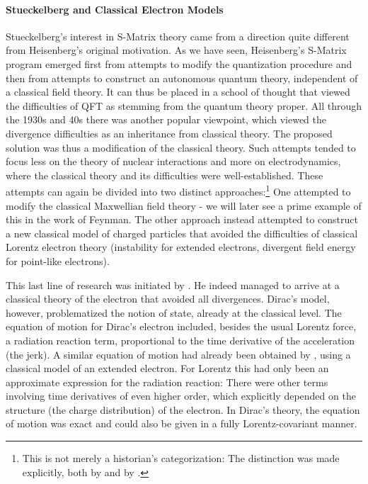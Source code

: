 \documentclass[12pt,a4paper]{article}
\begin{document}
\paragraph{Stueckelberg and Classical Electron Models}

Stueckelberg's interest in S-Matrix theory came from a direction quite different from Heisenberg's original motivation. As we have seen, Heisenberg's S-Matrix program emerged first from attempts to modify the quantization procedure and then from attempts to construct an autonomous quantum theory, independent of a classical field theory. It can thus be placed in a school of thought that viewed the difficulties of QFT as stemming from the quantum theory proper. All through the 1930s and 40s there was another popular viewpoint, which viewed the divergence difficulties as an inheritance from classical theory. The proposed solution was thus a modification of the classical theory. Such attempts tended to focus less on the theory of nuclear interactions and more on electrodynamics, where the classical theory and its difficulties were well-established. These attempts can again be divided into two distinct approaches:\footnote{This is not merely a historian's categorization: The distinction was made explicitly, both by \citet[p. 149]{dirac_1938_classical} and by \citet[p. 52]{stueckelberg_1941_un-nouveau}.} One attempted to modify the classical Maxwellian field theory - we will later see a prime example of this in the work of Feynman. The other approach instead attempted to construct a new classical model of charged particles that avoided the difficulties of classical Lorentz electron theory (instability for extended electrons, divergent field energy for point-like electrons).

This last line of research was initiated by \citet{dirac_1938_classical}. He indeed managed to arrive at a classical theory of the electron that avoided all divergences. Dirac's model, however, problematized the notion of state, already at the classical level. The equation of motion for Dirac's electron included, besides the usual Lorentz force, a radiation reaction term, proportional to the time derivative of the acceleration (the jerk). A similar equation of motion had already been obtained by \citet[p. 49]{lorentz_1916_the-theory}, using a classical model of an extended electron. For Lorentz this had only been an approximate expression for the radiation reaction: There were other terms involving time derivatives of even higher order, which explicitly depended on the structure (the charge distribution) of the electron. In Dirac's theory, the equation of motion was exact and could also be given in a fully Lorentz-covariant manner.
\end{document}

